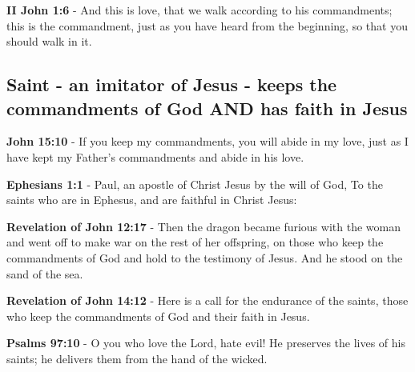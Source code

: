 \documentclass[11pt]{article}
\begin{document}
\textbf{II John 1:6} - And this is love, that we walk according to his commandments; this is the commandment, just as you have heard from the beginning, so that you should walk in it.

\subsection{Saint - an imitator of Jesus - keeps the commandments of God AND has faith in Jesus}
\label{sec:org52ee42e}
\textbf{John 15:10} - If you keep my commandments, you will abide in my love, just as I have kept my Father's commandments and abide in his love.

\textbf{Ephesians 1:1} - Paul, an apostle of Christ Jesus by the will of God, To the saints who are in Ephesus, and are faithful in Christ Jesus:

\textbf{Revelation of John 12:17} - Then the dragon became furious with the woman and went off to make war on the rest of her offspring, on those who keep the commandments of God and hold to the testimony of Jesus. And he stood on the sand of the sea.

\textbf{Revelation of John 14:12} - Here is a call for the endurance of the saints, those who keep the commandments of God and their faith in Jesus.

\textbf{Psalms 97:10} - O you who love the Lord, hate evil! He preserves the lives of his saints; he delivers them from the hand of the wicked.
\end{document}
